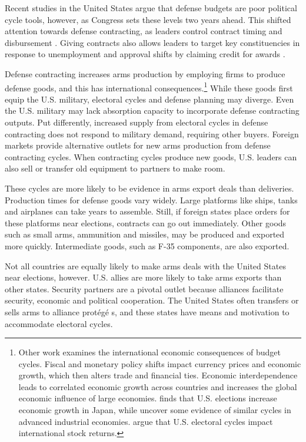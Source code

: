\documentclass[12pt]{article}
\begin{document}
Recent studies in the United States argue that defense budgets are poor political cycle tools, however, as Congress sets these levels two years ahead.
This shifted attention towards defense contracting, as leaders control contract timing and disbursement \citep{Mayer1995, DerouenHeo2000}.
Giving contracts also allows leaders to target key constituencies in response to unemployment and approval shifts by claiming credit for awards \citep{DerouenHeo2000}. 


Defense contracting increases arms production by employing firms to produce defense goods, and this has international consequences.\footnote{%
Other work examines the international economic consequences of budget cycles.
Fiscal and monetary policy shifts impact currency prices and economic growth, which then alters trade and financial ties. 
Economic interdependence leads to correlated economic growth across countries \citep{ArtisZhang1999, Kayser2006} and increases the global economic influence of large economies. 
\citet{Ito1991} finds that U.S. elections increase economic growth in Japan, while \citet{ThompsonZuk1983} uncover some evidence of similar cycles in advanced industrial economies.
\citet{FoersterSchmitz1997} argue that U.S. electoral cycles impact international stock returns.
}
While these goods first equip the U.S. military, electoral cycles and defense planning may diverge.
Even the U.S. military may lack absorption capacity to incorporate defense contracting outputs.
Put differently, increased supply from electoral cycles in defense contracting does not respond to military demand, requiring other buyers. 
Foreign markets provide alternative outlets for new arms production from defense contracting cycles. 
When contracting cycles produce new goods, U.S. leaders can also sell or transfer old equipment to partners to make room.


These cycles are more likely to be evidence in arms export deals than deliveries. 
Production times for defense goods vary widely. 
Large platforms like ships, tanks and airplanes can take years to assemble. 
Still, if foreign states place orders for these platforms near elections, contracts can go out immediately.
Other goods such as small arms, ammunition and missiles, may be produced and exported more quickly. 
Intermediate goods, such as F-35 components, are also exported. 


Not all countries are equally likely to make arms deals with the United States near elections, however. 
U.S. allies are more likely to take arms exports than other states. 
Security partners are a pivotal outlet because alliances facilitate security, economic and political cooperation.
The United States often transfers or sells arms to alliance prot{\'e}g{\'e} s, and these states have means and motivation to accommodate electoral cycles. 
\end{document}
